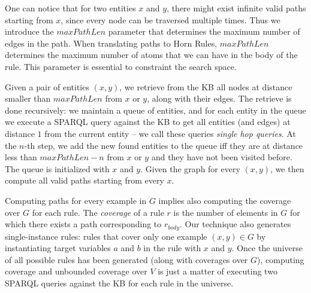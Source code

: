 One can notice that for two entities $x$ and $y$, there might exist infinite valid paths starting from $x$, since every node can be traversed multiple times. Thus we introduce the $maxPathLen$ parameter that determines the maximum number of edges in the path. When translating paths to Horn Rules, $maxPathLen$ determines the maximum number of atoms that we can have in the body of the rule. This parameter is essential 
to constraint the search space.


\vspace{0.5ex}
Given a pair of entities $(x,y)$, we retrieve from the KB all nodes at distance smaller than $maxPathLen$ from $x$ or $y$, along with their edges. The retrieve is done recursively: we maintain a queue of entities, and for each entity in the queue we execute a SPARQL query against the KB to get all entities (and edges) at distance $1$ from the current entity -- we call these queries \emph{single hop queries}. At the $n$-th step, we add the new found entities to the queue iff they are at distance less than $maxPathLen-n$ from $x$ or $y$ and they have not been visited before. The queue is initialized with $x$ and $y$. 
%
Given the graph for every $(x,y)$, we then compute all valid paths starting from every $x$. 

\vspace{0.5ex}
Computing paths for every example in $G$ implies also computing the coverage over $G$ for each rule. The {\em coverage} of a rule $r$ is the number of elements in $G$ for which there exists a path corresponding to $r_{body}$. 
%
Our technique also generates single-instance rules: rules that cover only one example $(x,y) \in G$ by instantiating target variables $a$ and $b$ in the rule with $x$ and $y$. 
%
Once the universe of all possible rules has been generated (along with coverages over $G$), computing coverage and unbounded coverage over $V$ is just a matter of executing two SPARQL queries against the KB for each rule in the universe.

